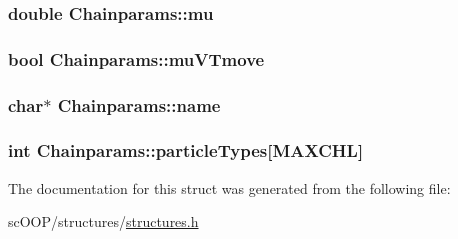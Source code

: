 \hypertarget{struct_chainparams_a8b4693f8f1c2016cef75346171d11fe7}{
\subsubsection[{mu}]{\setlength{\rightskip}{0pt plus 5cm}double Chainparams\+::mu}}\label{struct_chainparams_a8b4693f8f1c2016cef75346171d11fe7}
\hypertarget{struct_chainparams_ad5fd909308c144630b1f7a8f22cfd915}{
\subsubsection[{mu\+V\+Tmove}]{\setlength{\rightskip}{0pt plus 5cm}bool Chainparams\+::mu\+V\+Tmove}}\label{struct_chainparams_ad5fd909308c144630b1f7a8f22cfd915}
\hypertarget{struct_chainparams_a5b2a5b0e02644a6540922c86ec2745c2}{
\subsubsection[{name}]{\setlength{\rightskip}{0pt plus 5cm}char$\ast$ Chainparams\+::name}}\label{struct_chainparams_a5b2a5b0e02644a6540922c86ec2745c2}
\hypertarget{struct_chainparams_af91ce9382aa5752a5b97300da4205494}{
\subsubsection[{particle\+Types}]{\setlength{\rightskip}{0pt plus 5cm}int Chainparams\+::particle\+Types\mbox{[}{\bf M\+A\+X\+C\+H\+L}\mbox{]}}}\label{struct_chainparams_af91ce9382aa5752a5b97300da4205494}


The documentation for this struct was generated from the following file\+:\begin{DoxyCompactItemize}
\item 
sc\+O\+O\+P/structures/\hyperlink{structures_8h}{structures.\+h}\end{DoxyCompactItemize}
